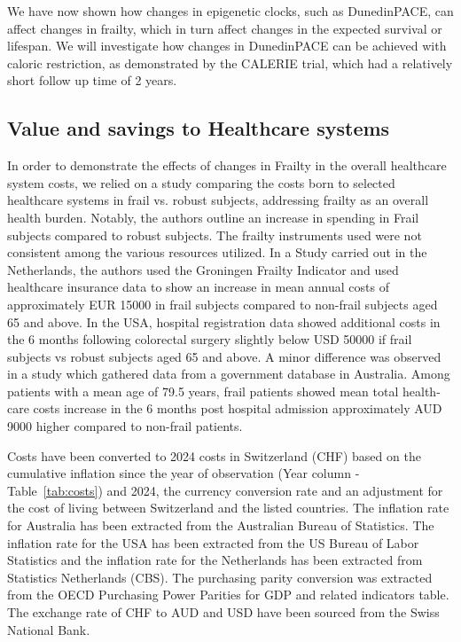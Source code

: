 We have now shown how changes in epigenetic clocks, such as DunedinPACE, can affect changes in frailty, which in turn affect changes in the expected survival or lifespan. We will investigate how changes in DunedinPACE can be achieved with caloric restriction, as demonstrated by the CALERIE trial, which had a relatively short follow up time of 2 years.

\subsection{Value and savings to Healthcare systems}

In order to demonstrate the effects of changes in Frailty in the overall healthcare system costs, we relied on a study comparing the costs born to selected healthcare systems in frail vs. robust subjects, addressing frailty as an overall health burden\cite{Hoogendijk2019}. Notably, the authors outline an increase in spending in Frail subjects compared to robust subjects. The frailty instruments used were not consistent among the various resources utilized. In a Study carried out in the Netherlands, the authors used the Groningen Frailty Indicator and used healthcare insurance data to show an increase in mean annual costs of approximately EUR 15000 in frail subjects compared to non-frail subjects aged 65 and above\cite{Peters2015}. In the USA, hospital registration data showed additional costs in the 6 months following colorectal surgery slightly below USD 50000 if frail subjects vs robust subjects aged 65 and above\cite{Robinson2011}. A minor difference was observed in a study which gathered data from a government database in Australia. Among patients with a mean age of 79.5 years, frail patients showed mean total health-care costs increase in the 6 months post hospital admission approximately AUD 9000 higher compared to non-frail patients\cite{Comans2016}.

Costs have been converted to 2024 costs in Switzerland (CHF) based on the cumulative inflation since the year of observation (Year column - Table~\ref{tab:costs}) and 2024, the currency conversion rate and an adjustment for the cost of living between Switzerland and the listed countries. The inflation rate for Australia has been extracted from the Australian Bureau of Statistics\cite{ABS2023}. The inflation rate for the USA has been extracted from the US Bureau of Labor Statistics\cite{BLS2024} and the inflation rate for the Netherlands has been extracted from Statistics Netherlands (CBS)\cite{CBS2024}. The purchasing parity conversion was extracted from the OECD Purchasing Power Parities for GDP and related indicators table\cite{OECD}. The exchange rate of CHF to AUD and USD have been sourced from the Swiss National Bank\cite{SNB}.

